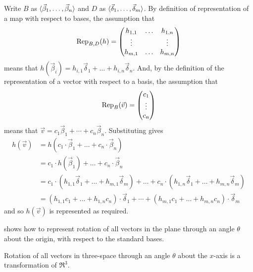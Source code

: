\begin{exercises}
\begin{answer}
      Write \( B \) as \( \sequence{\vec{\beta}_1,\ldots,\vec{\beta}_n} \)
      and  \( D \) as \( \sequence{\vec{\delta}_1,\dots,\vec{\delta}_m} \).
      By definition of representation of a map with respect to bases,
      the assumption that
      \begin{equation*}
        \rep{h}{B,D}
        =\begin{pmatrix}
           h_{1,1} &\ldots  &h_{1,n}  \\
           \vdots  &        &\vdots   \\
           h_{m,1} &\ldots  &h_{m,n}
         \end{pmatrix}
      \end{equation*}
      means that
      $h(\vec{\beta}_i)=h_{i,1}\vec{\delta}_1+\dots+h_{i,n}\vec{\delta}_n$.
      And, by the definition of the representation of a vector with respect to
      a basis, the assumption that
      \begin{equation*}
        \rep{\vec{v}}{B}=\colvec{c_1 \\ \vdots \\ c_n}
      \end{equation*}
      means that \( \vec{v}=c_1\vec{\beta}_1+\cdots+c_n\vec{\beta}_n \).
      Substituting gives
      \begin{align*}
        h(\vec{v})
        &=h(c_1\cdot\vec{\beta}_1+\dots+c_n\cdot\vec{\beta}_n)      \\
        &=c_1\cdot h(\vec{\beta}_1)+\dots+c_n\cdot \vec{\beta}_n    \\
        &=c_1\cdot (h_{1,1}\vec{\delta}_1+\dots+h_{m,1}\vec{\delta}_m) 
        +\dots                                         
        +c_n\cdot (h_{1,n}\vec{\delta}_1+\dots+h_{m,n}\vec{\delta}_m) \\
        &=(h_{1,1}c_1+\dots+h_{1,n}c_n)\cdot\vec{\delta}_1    
        +\cdots                                
        +(h_{m,1}c_1+\dots+h_{m,n}c_n)\cdot\vec{\delta}_m
      \end{align*}
      and so $h(\vec{v})$ is represented as required.   
    \end{answer}
  \recommended \item  
     shows how to represent 
    rotation of all vectors in the plane through an angle
    \( \theta \) about the origin,
    with respect to the standard bases.
    \begin{exparts}
      \partsitem Rotation of all vectors in three-space through an angle
        \( \theta \) about the \( x \)-axis is a transformation of $\Re^3$.

\end{exparts}
\end{exercises}
